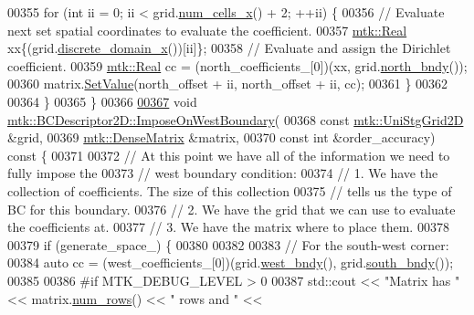 \begin{DoxyCode}
00355     \textcolor{keywordflow}{for} (\textcolor{keywordtype}{int} ii = 0; ii < grid.\hyperlink{classmtk_1_1UniStgGrid2D_a2d182866a398aba8e4829590e85bf939}{num\_cells\_x}() + 2; ++ii) \{
00356       \textcolor{comment}{// Evaluate next set spatial coordinates to evaluate the coefficient.}
00357       \hyperlink{group__c01-roots_gac080bbbf5cbb5502c9f00405f894857d}{mtk::Real} xx\{(grid.\hyperlink{classmtk_1_1UniStgGrid2D_ab2f70cf5cd0a2d5486992d9f2f8baa4a}{discrete\_domain\_x}())[ii]\};
00358       \textcolor{comment}{// Evaluate and assign the Dirichlet coefficient.}
00359       \hyperlink{group__c01-roots_gac080bbbf5cbb5502c9f00405f894857d}{mtk::Real} cc = (north\_coefficients\_[0])(xx, grid.\hyperlink{classmtk_1_1UniStgGrid2D_afe1ead253cdeb5503e0489eba8fd84e2}{north\_bndy}());
00360       matrix.\hyperlink{classmtk_1_1DenseMatrix_a784ce5784109ac86bfb9d8562b334b13}{SetValue}(north\_offset + ii, north\_offset + ii, cc);
00361     \}
00362 
00364   \}
00365 \}
00366 
\hypertarget{mtk__bc__descriptor__2d_8cc_source_l00367}{}\hyperlink{classmtk_1_1BCDescriptor2D_a0e7bc4d22fa8c9b9a29dd71669b35744}{00367} \textcolor{keywordtype}{void} \hyperlink{classmtk_1_1BCDescriptor2D_a0e7bc4d22fa8c9b9a29dd71669b35744}{mtk::BCDescriptor2D::ImposeOnWestBoundary}(
00368     \textcolor{keyword}{const} \hyperlink{classmtk_1_1UniStgGrid2D}{mtk::UniStgGrid2D} &grid,
00369     \hyperlink{classmtk_1_1DenseMatrix}{mtk::DenseMatrix} &matrix,
00370     \textcolor{keyword}{const} \textcolor{keywordtype}{int} &order\_accuracy)\textcolor{keyword}{ const }\{
00371 
00372   \textcolor{comment}{// At this point we have all of the information we need to fully impose the}
00373   \textcolor{comment}{// west boundary condition:}
00374   \textcolor{comment}{// 1. We have the collection of coefficients. The size of this collection}
00375   \textcolor{comment}{// tells us the type of BC for this boundary.}
00376   \textcolor{comment}{// 2. We have the grid that we can use to evaluate the coefficients at.}
00377   \textcolor{comment}{// 3. We have the matrix where to place them.}
00378 
00379   \textcolor{keywordflow}{if} (generate\_space\_) \{
00380 
00382 
00383     \textcolor{comment}{// For the south-west corner:}
00384     \textcolor{keyword}{auto} cc = (west\_coefficients\_[0])(grid.\hyperlink{classmtk_1_1UniStgGrid2D_af2b1712387ded85edaf2b64617d3fc13}{west\_bndy}(), grid.\hyperlink{classmtk_1_1UniStgGrid2D_a1442eaf219f099d0ebf46a170fdebf92}{south\_bndy}());
00385 
00386 \textcolor{preprocessor}{    #if MTK\_DEBUG\_LEVEL > 0}
00387     std::cout << \textcolor{stringliteral}{"Matrix has "} << matrix.\hyperlink{classmtk_1_1DenseMatrix_a53f3afb3b6a8d21854458aaa9663cc74}{num\_rows}() << \textcolor{stringliteral}{" rows and "} <<

\end{DoxyCode}
